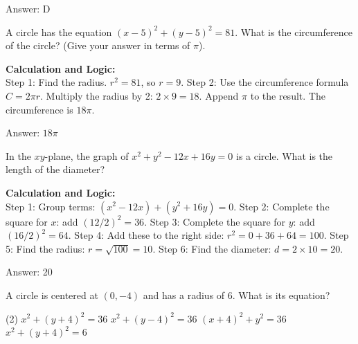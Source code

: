 \documentclass[11pt,paper=a4,answers]{exam}
\begin{document}
\begin{questions}
\begin{solution}
\vspace{30pt}

Answer: \colorbox{yellow!100}{D}
\end{solution}

\vspace{60pt}

\question
A circle has the equation $(x - 5)^2 + (y - 5)^2 = 81$. What is the circumference of the circle? (Give your answer in terms of $\pi$).

\begin{solution}
\textbf{Calculation and Logic:} \\
Step 1: Find the radius. $r^2 = 81$, so $r = 9$. Step 2: Use the circumference formula $C = 2\pi r$. Multiply the radius by 2: $2 \times 9 = 18$. Append $\pi$ to the result. The circumference is $18\pi$.

\vspace{30pt}

Answer: \colorbox{yellow!100}{$18\pi$}
\end{solution}

\vspace{60pt}

\question
In the $xy$-plane, the graph of $x^2 + y^2 - 12x + 16y = 0$ is a circle. What is the length of the diameter?

\begin{solution}
\textbf{Calculation and Logic:} \\
Step 1: Group terms: $(x^2 - 12x) + (y^2 + 16y) = 0$. Step 2: Complete the square for $x$: add $(12/2)^2 = 36$. Step 3: Complete the square for $y$: add $(16/2)^2 = 64$. Step 4: Add these to the right side: $r^2 = 0 + 36 + 64 = 100$. Step 5: Find the radius: $r = \sqrt{100} = 10$. Step 6: Find the diameter: $d = 2 \times 10 = 20$.

\vspace{30pt}

Answer: \colorbox{yellow!100}{20}
\end{solution}

\vspace{60pt}

\question
A circle is centered at $(0, -4)$ and has a radius of 6. What is its equation?
\begin{tasks}(2)
    \task $x^2 + (y + 4)^2 = 36$
    \task $x^2 + (y - 4)^2 = 36$
    \task $(x + 4)^2 + y^2 = 36$
    \task $x^2 + (y + 4)^2 = 6$
\end{tasks}


\end{questions}
\end{document}
